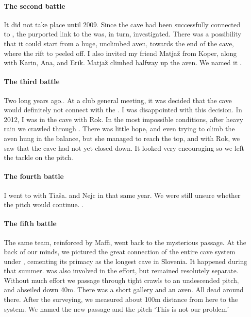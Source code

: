 \paragraph{The second battle} It did not take place until 2009. Since the cave had been successfully connected to , the purported link to the  was, in turn, investigated. There was a possibility that it could start from a huge, unclimbed aven, towards the end of the cave, where the rift to  peeled off. I also invited my friend Matjaž from Koper, along with Karin, Ana, and Erik. Matjaž climbed halfway up the aven. We named it .


\paragraph {The third battle} Two long years ago.. At a club general meeting, it was decided that the cave would definitely not connect with the .  I was disappointed with this decision. In 2012, I was in the cave with Rok.  In the most impossible conditions, after heavy rain we crawled through . There was little hope, and even trying to climb the aven hung in the balance, but she managed to reach the top, and with Rok, we saw that the cave had not yet closed down. It looked very encouraging so we left the tackle on the pitch.


 \paragraph {The fourth battle} I went to  with Tia{\v{s}}a. and Nejc in that same year. We were still unsure whether the pitch would continue. .


\paragraph{The fifth battle}  The same team, reinforced by Maffi, went back to the mysterious passage. At the back of our minds, we pictured the great connection of the entire cave system under , cementing its primacy as the longest cave in Slovenia. It happened during that summer.  was also involved in the effort, but remained resolutely separate. Without much effort we passage through tight crawls to an undescended pitch, and abseiled down 40m. There was a short gallery and an aven. All dead around there. After the surveying, we measured about 100m distance from here to the system. We named the new passage and the pitch `This is not our problem' 

